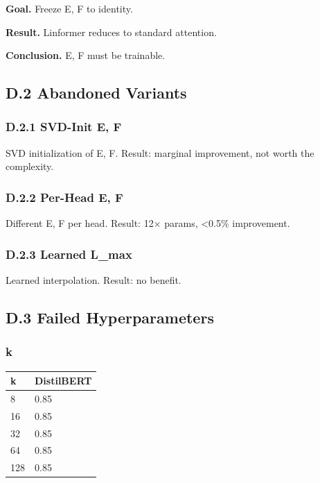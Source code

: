 \textbf{Goal.} Freeze E, F to identity.

\textbf{Result.} Linformer reduces to standard attention.

\textbf{Conclusion.} E, F must be trainable.

\subsection{D.2 Abandoned Variants}

\subsubsection{D.2.1 SVD-Init E, F}

SVD initialization of E, F. Result: marginal improvement, not worth the 
complexity.

\subsubsection{D.2.2 Per-Head E, F}

Different E, F per head. Result: 12$\times$ params, <0.5\% improvement.

\subsubsection{D.2.3 Learned L\_max}

Learned interpolation. Result: no benefit.

\subsection{D.3 Failed Hyperparameters}

\subsubsection{k}

\begin{table}[H]
\centering
\small
\begin{tabular}{ll}
\toprule
\textbf{k} & \textbf{DistilBERT} \\
\midrule
8 & 0.85 \\
16 & 0.85 \\
32 & 0.85 \\
64 & 0.85 \\
128 & 0.85 \\
\bottomrule
\end{tabular}
\end{table}

